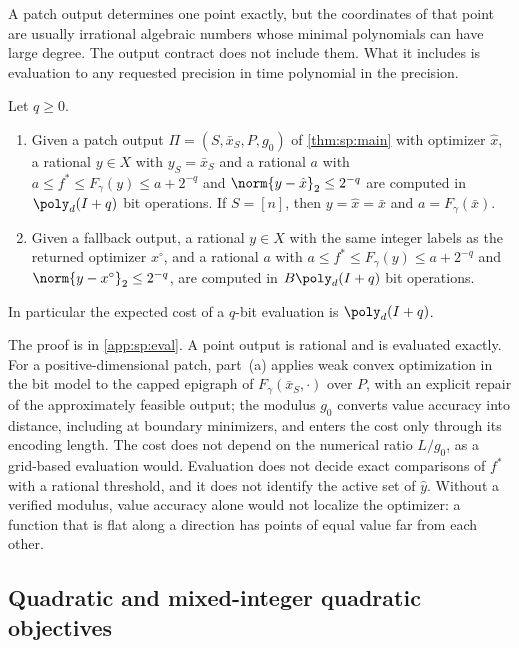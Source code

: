 A patch output determines one point exactly, but the coordinates of that
point are usually irrational algebraic numbers whose minimal polynomials can
have large degree. The output contract does not include them. What it
includes is evaluation to any requested precision in time polynomial in the
precision.

\begin{proposition}[Evaluation]\label{prop:sp:eval}
Let $q\ge0$.
\begin{enumerate}[label=(\alph*)]
\item Given a patch output $\Pi=(S,\bar x_S,P,g_0)$ of \cref{thm:sp:main}
with optimizer $\hat x$, a rational $y\in X$ with $y_S=\bar x_S$ and a
rational $a$ with $a\le f^*\le F_\gamma(y)\le a+2^{-q}$ and
$\norm{y-\hat x}_2\le2^{-q}$ are computed in $\poly_d(I+q)$ bit operations.
If $S=[n]$, then $y=\hat x=\bar x$ and $a=F_\gamma(\bar x)$.
\item Given a fallback output, a rational $y\in X$ with the same integer
labels as the returned optimizer $x^\circ$, and a rational $a$ with
$a\le f^*\le F_\gamma(y)\le a+2^{-q}$ and $\norm{y-x^\circ}_2\le2^{-q}$, are
computed in $B\poly_d(I+q)$ bit operations.
\end{enumerate}
In particular the expected cost of a $q$-bit evaluation is $\poly_d(I+q)$.
\end{proposition}

The proof is in \cref{app:sp:eval}. A point output is rational and is
evaluated exactly. For a positive-dimensional patch, part~(a) applies weak
convex optimization in the bit model \citep[Definition~2.1.10 and
Corollary~4.2.7]{grotschel1988-geometric-algorithms-and-combinatorial-optimization} to the capped epigraph of
$F_\gamma(\bar x_S,\cdot)$ over $P$, with an explicit repair of the
approximately feasible output; the modulus $g_0$ converts value accuracy
into distance, including at boundary minimizers, and enters the cost only
through its encoding length. The cost does not depend on the numerical ratio
$L/g_0$, as a grid-based evaluation would. Evaluation does not decide exact
comparisons of $f^*$ with a rational threshold, and it does not identify the
active set of $\hat y$. Without a verified modulus, value accuracy alone
would not localize the optimizer: a function that is flat along a direction
has points of equal value far from each other.

\subsection{Quadratic and mixed-integer quadratic objectives}\label{sec:sp:qp}

